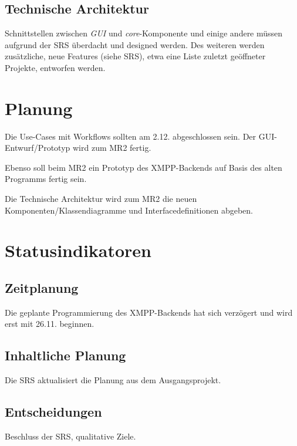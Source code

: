 \subsection{Technische Architektur}
Schnittstellen zwischen \emph{GUI} und \emph{core}-Komponente und einige andere müssen
aufgrund der SRS überdacht und designed werden. Des weiteren werden zusätzliche,
neue Features (siehe SRS), etwa eine Liste zuletzt geöffneter Projekte,
entworfen werden.
\section{Planung}
Die Use-Cases mit Workflows sollten am 2.12. abgeschlossen sein. Der
GUI-Entwurf/Prototyp wird zum MR2 fertig.

Ebenso soll beim MR2 ein Prototyp des XMPP-Backends auf Basis des alten
Programms fertig sein.

Die Technische Architektur wird zum MR2 die neuen Komponenten/Klassendiagramme
und Interfacedefinitionen abgeben.

\section{Statusindikatoren}

\subsection{Zeitplanung}
Die geplante Programmierung des XMPP-Backends hat sich verzögert und wird erst
mit 26.11. beginnen.

\subsection{Inhaltliche Planung}
Die SRS aktualisiert die Planung aus dem Ausgangsprojekt.

\subsection{Entscheidungen}
Beschluss der SRS, qualitative Ziele.

















